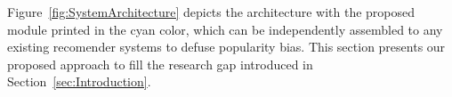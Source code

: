 












Figure~\ref{fig:SystemArchitecture} depicts the architecture with the proposed module printed in the cyan color, which can be independently assembled to any existing recomender systems %
to defuse popularity bias.
This section presents our proposed approach to fill the research gap introduced in Section~\ref{sec:Introduction}. %





